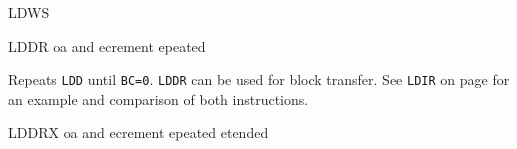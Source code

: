 \begin{basedescript}{
	\desclabelstyle{\multilinelabel}
	\desclabelwidth{3cm}}
\begin{DetailItem}{LDWS}{\DetailItemZXN}
	\end{DetailItem}

	\pagebreak



	\begin{DetailItem}{LDDR}{}
		{oa\IH{D} and ecrement epeated}		
		{\SymLDDR}

		Repeats {\tt LDD} until {\tt BC=0}. {\tt LDDR} can be used for block transfer. See {\tt LDIR} on page  for an example and comparison of both instructions.

		\begin{DetailEffects}
			\FlagsLDDR
		\end{DetailEffects}
				
		\begin{DetailTiming}
		\end{DetailTiming}

	\end{DetailItem}


	\begin{DetailItem}{LDDRX}{\DetailItemZXN}
		{oa\IH{D} and ecrement epeated etended}		
		{\SymLDDRX}


\end{DetailItem}
\end{basedescript}
